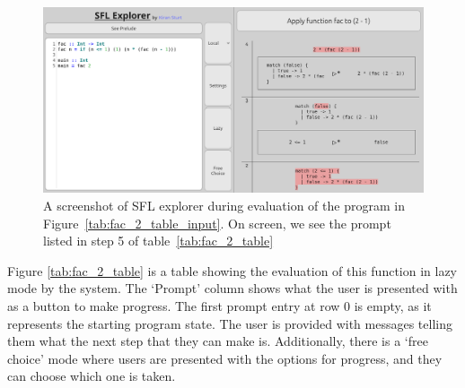 \begin{figure}[t]
  \centering
  \includegraphics[width=0.95\linewidth]{images/intro_fac_2.png}
  \caption{A screenshot of SFL explorer during evaluation of the program in Figure~\ref{tab:fac_2_table_input}. On screen, we see the prompt listed in step 5 of table~\ref{tab:fac_2_table}}
  \label{intro_fac_2_screenshot}
\end{figure}

Figure \ref{tab:fac_2_table} is a table showing the evaluation of this function in lazy mode by the system. The `Prompt' column shows what the user is presented with as a button to make progress. The first prompt entry at row $0$ is empty, as it represents the starting program state. The user is provided with messages telling them what the next step that they can make is. Additionally, there is a `free choice' mode where users are presented with the options for progress, and they can choose which one is taken. 





